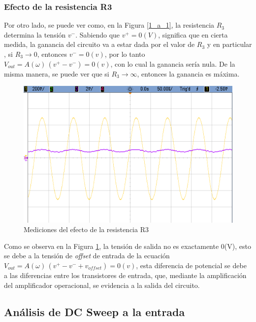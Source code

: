 \subsubsection{Efecto de la resistencia R3}

Por otro lado, se puede ver como, en la Figura \ref{1_a_1}, la resistencia
$R_{3}$ determina la tensión $v^{-}$. Sabiendo que $v^{+}=0(V)$,
significa que en cierta medida, la ganancia del circuito va a estar
dada por el valor de $R_{3}$ y en particular , si $R_{3}\longrightarrow0$,
entonces $v^{-}=0(v)$, por lo tanto $V_{out}=A(\omega)\,\left(v^{+}-v^{-}\right)=0(v)$,
con lo cual la ganancia sería nula. De la misma manera, se puede ver
que si $R_{3}\longrightarrow\infty$, entonces la ganancia es máxima.

\begin{figure}[H]
\begin{centering}
\includegraphics[scale=0.3]{../Ex1/iA/Resources1a/r3=0}
\par\end{centering}
\caption{Mediciones del efecto de la resistencia R3}
\label{1_a_23}
\end{figure}

Como se observa en la Figura \ref{1_a_23}, la tensión de salida no
es exactamente 0(V), esto se debe a la tensión de \emph{offset} de
entrada de la ecuación $V_{out}=A(\omega)\,\left(v^{+}-v^{-}+v_{offset}\right)=0(v)$,
esta diferencia de potencial se debe a las diferencias entre los transistores
de entrada, que, mediante la amplificación del amplificador operacional,
se evidencia a la salida del circuito.

\subsection{Análisis de DC Sweep a la entrada}

